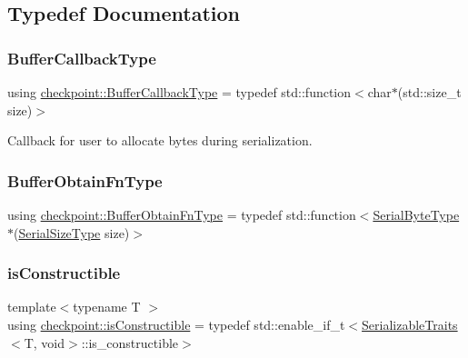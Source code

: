 \subsection{Typedef Documentation}
\mbox{\label{namespacecheckpoint_a70bc1b37eae8e32129df38d981ef90f6}} 
\subsubsection{\texorpdfstring{Buffer\+Callback\+Type}{BufferCallbackType}}
{\footnotesize\ttfamily using \hyperlink{namespacecheckpoint_a70bc1b37eae8e32129df38d981ef90f6}{checkpoint\+::\+Buffer\+Callback\+Type} = typedef std\+::function$<$char$\ast$(std\+::size\+\_\+t size)$>$}



Callback for user to allocate bytes during serialization. 

\mbox{\label{namespacecheckpoint_a8a2558a1dd0db386339dd81c193b7f10}} 
\subsubsection{\texorpdfstring{Buffer\+Obtain\+Fn\+Type}{BufferObtainFnType}}
{\footnotesize\ttfamily using \hyperlink{namespacecheckpoint_a8a2558a1dd0db386339dd81c193b7f10}{checkpoint\+::\+Buffer\+Obtain\+Fn\+Type} = typedef std\+::function$<$\hyperlink{namespacecheckpoint_ae57f01cdc0b81776c23b6c7c934c58f5}{Serial\+Byte\+Type}$\ast$(\hyperlink{namespacecheckpoint_a083f6674da3f94c2901b18c6d238217c}{Serial\+Size\+Type} size)$>$}

\mbox{\label{namespacecheckpoint_a48ec2649d5cbd890f67ea1193cc0d51a}} 
\subsubsection{\texorpdfstring{is\+Constructible}{isConstructible}}
{\footnotesize\ttfamily template$<$typename T $>$ \\
using \hyperlink{namespacecheckpoint_a48ec2649d5cbd890f67ea1193cc0d51a}{checkpoint\+::is\+Constructible} = typedef std\+::enable\+\_\+if\+\_\+t$<$\hyperlink{structcheckpoint_1_1_serializable_traits}{Serializable\+Traits}$<$T, void$>$\+::is\+\_\+constructible$>$}

